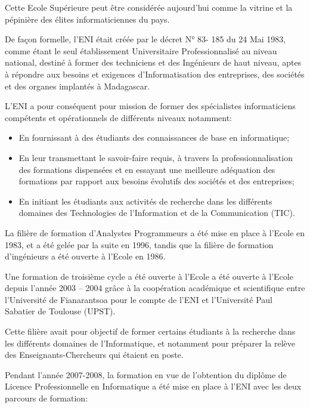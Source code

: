\documentclass[12pt]{report}
\begin{document}
				Cette Ecole Supérieure peut être considérée aujourd’hui comme la vitrine et la pépinière des élites informaticiennes du pays.
	
				De façon formelle, l’ENI était créée par le décret N° 83- 185 du 24 Mai 1983, comme étant le seul établissement Universitaire Professionnalisé au niveau national, destiné à former des techniciens et des Ingénieurs de haut niveau, aptes à répondre aux besoins et exigences d’Informatisation des entreprises, des sociétés et des organes implantés à Madagascar.

				L’ENI a pour conséquent pour mission de former des spécialistes informaticiens compétents et opérationnels de différents niveaux notamment: 
				
								\begin{itemize}
									\item En fournissant à des étudiants des connaissances de base en informatique;
									\item En leur transmettant le savoir-faire requis, à travers la professionnalisation des formations dispensées et en essayant une meilleure adéquation des formations par rapport aux besoins évolutifs des sociétés et des entreprises;
									\item En initiant les étudiants aux activités de recherche dans les différents domaines des Technologies de l’Information et de la Communication (TIC).
								\end{itemize}

				La filière de formation d’Analystes Programmeurs a été mise en place à l’Ecole en 1983, et a été gelée par la suite en 1996, tandis que la filière de formation d’ingénieurs a été ouverte à l’Ecole en 1986.
				
				Une formation de troisième cycle a été ouverte à l’Ecole a été ouverte à l’Ecole depuis l’année 2003 – 2004 grâce à la coopération académique et scientifique entre l’Université de Fianarantsoa pour le compte de l’ENI et l’Université Paul Sabatier de Toulouse (UPST).

				Cette filière avait pour objectif de former certains étudiants à la recherche dans les différents domaines de l’Informatique, et notamment pour préparer la relève des Enseignants-Chercheurs qui étaient en poste.

				Pendant l’année 2007-2008, la formation en vue de l’obtention du diplôme de Licence Professionnelle en Informatique a été mise en place à l’ENI avec les deux parcours de formation:
					
\end{document}
